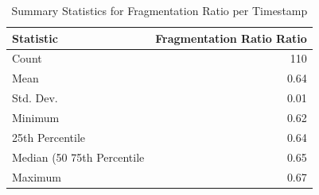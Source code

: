\begin{table}[htbp]
\centering
\caption{Summary Statistics for Fragmentation Ratio per Timestamp}
\label{tab:contiguity_fragmentation_ratio}
\begin{tabular}{lr}
\toprule
Statistic & Fragmentation Ratio Ratio \\
\midrule
Count & 110 \\
Mean & 0.64 \\
Std. Dev. & 0.01 \\
Minimum & 0.62 \\
25th Percentile & 0.64 \\
Median (50%
75th Percentile & 0.65 \\
Maximum & 0.67 \\
\bottomrule
\end{tabular}
\end{table}
